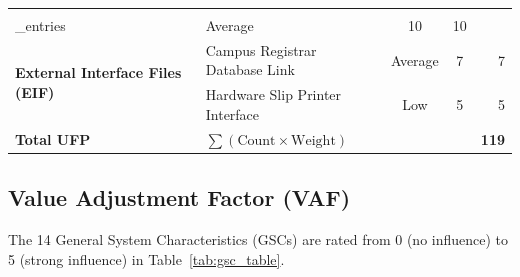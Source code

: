 \documentclass[12pt,a4paper,oneside]{report}
\begin{document}
\begin{table}[H]
\begin{tabular}{llccr}
        & \texttt{ballot\\_entries} table & Average & 10 & 10 \\
        \midrule
        \multirow{2}{*}{\textbf{External Interface Files (EIF)}} 
        & Campus Registrar Database Link & Average & 7 & 7 \\
        & Hardware Slip Printer Interface & Low & 5 & 5 \\
        \midrule
        \textbf{Total UFP} & \multicolumn{3}{l}{$\sum (\text{Count} \times \text{Weight})$} & \textbf{119} \\
        \bottomrule
    \end{tabular}
\end{table}

\subsection{Value Adjustment Factor (VAF)}
The 14 General System Characteristics (GSCs) are rated from 0 (no influence) to 5 (strong influence) in Table~\ref{tab:gsc_table}.
\end{document}
